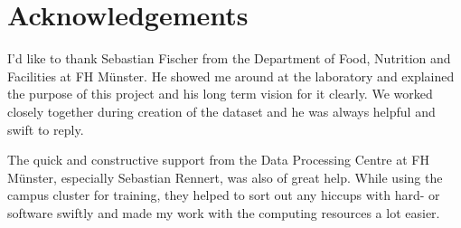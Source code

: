 \chapter*{Acknowledgements}

I'd like to thank Sebastian Fischer from the Department of Food, Nutrition and Facilities at FH Münster. He showed me around at the laboratory and explained the purpose of this project and his long term vision for it clearly. We worked closely together during creation of the dataset and he was always helpful and swift to reply.

The quick and constructive support from the Data Processing Centre at FH Münster, especially Sebastian Rennert, was also of great help. While using the campus cluster for training, they helped to sort out any hiccups with hard- or software swiftly and made my work with the computing resources a lot easier.
